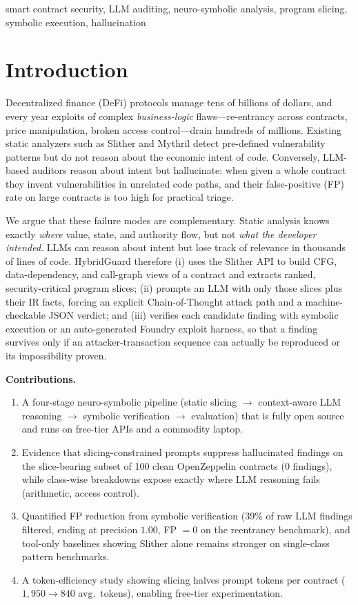 \documentclass[conference]{IEEEtran}
\newcommand{\system}{HybridGuard}
\begin{document}
\begin{IEEEkeywords}
smart contract security, LLM auditing, neuro-symbolic analysis, program slicing, symbolic execution, hallucination
\end{IEEEkeywords}

\section{Introduction}
Decentralized finance (DeFi) protocols manage tens of billions of dollars, and every year exploits
of complex \emph{business-logic} flaws---re-entrancy across contracts, price manipulation, broken
access control---drain hundreds of millions. Existing static analyzers such as Slither and Mythril
detect pre-defined vulnerability patterns but do not reason about the economic intent of code.
Conversely, LLM-based auditors reason about intent but hallucinate: when given a whole contract they
invent vulnerabilities in unrelated code paths, and their false-positive (FP) rate on large
contracts is too high for practical triage.

We argue that these failure modes are complementary. Static analysis knows exactly \emph{where}
value, state, and authority flow, but not \emph{what the developer intended}. LLMs can reason about
intent but lose track of relevance in thousands of lines of code. \system{} therefore (i) uses the
Slither API to build CFG, data-dependency, and call-graph views of a contract and extracts ranked,
security-critical program slices; (ii) prompts an LLM with only those slices plus their IR facts,
forcing an explicit Chain-of-Thought attack path and a machine-checkable JSON verdict; and
(iii) verifies each candidate finding with symbolic execution or an auto-generated Foundry exploit
harness, so that a finding survives only if an attacker-transaction sequence can actually be
reproduced or its impossibility proven.

\noindent\textbf{Contributions.}
\begin{enumerate}
  \item A four-stage neuro-symbolic pipeline (static slicing $\rightarrow$ context-aware LLM
        reasoning $\rightarrow$ symbolic verification $\rightarrow$ evaluation) that is fully open
        source and runs on free-tier APIs and a commodity laptop.
  \item Evidence that slicing-constrained prompts suppress hallucinated findings on the
        slice-bearing subset of 100 clean OpenZeppelin contracts (0 findings), while class-wise
        breakdowns expose exactly where LLM reasoning fails (arithmetic, access control).
  \item Quantified FP reduction from symbolic verification (39\% of raw LLM findings filtered,
        ending at precision $1.00$, FP $= 0$ on the reentrancy benchmark), and tool-only baselines
        showing Slither alone remains stronger on single-class pattern benchmarks.
  \item A token-efficiency study showing slicing halves prompt tokens per contract
        ($1{,}950 \rightarrow 840$ avg.\ tokens), enabling free-tier experimentation.
\end{enumerate}
\end{document}
